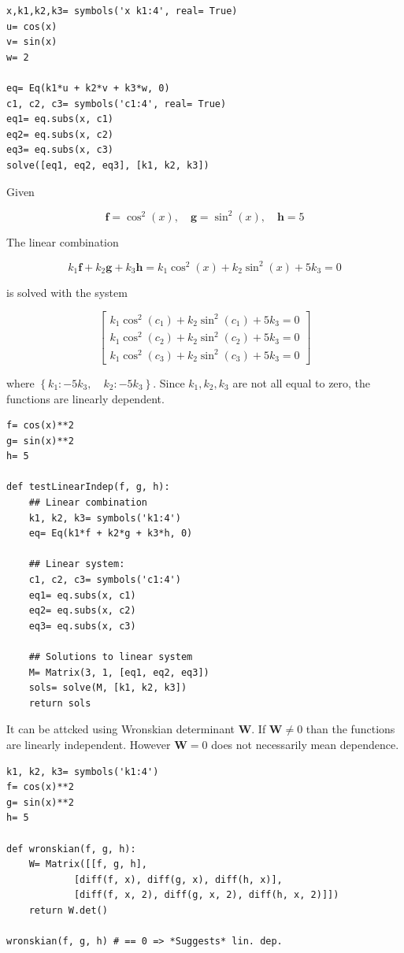 \begin{verbatim}
x,k1,k2,k3= symbols('x k1:4', real= True)
u= cos(x)
v= sin(x)
w= 2

eq= Eq(k1*u + k2*v + k3*w, 0)
c1, c2, c3= symbols('c1:4', real= True)
eq1= eq.subs(x, c1)
eq2= eq.subs(x, c2)
eq3= eq.subs(x, c3)
solve([eq1, eq2, eq3], [k1, k2, k3])
\end{verbatim}

Given

$$
\mathbf{f} = \cos^{2}{\left (x \right )}, \quad
\mathbf{g}= \sin^{2}{\left (x \right )}, \quad
\mathbf{h}= 5
$$

The linear combination

$$
k_{1} \mathbf{f} + k_{2} \mathbf{g} + k_3 \mathbf{h} = 
k_{1} \cos^{2}{\left (x \right )} + k_{2} \sin^{2}{\left (x \right )} + 5 k_{3} = 0
$$

is solved with the system

$$
\left[\begin{matrix}
k_{1} \cos^{2}{\left (c_{1} \right )} + k_{2} \sin^{2}{\left (c_{1} \right )} + 5 k_{3} = 0 \\
k_{1} \cos^{2}{\left (c_{2} \right )} + k_{2} \sin^{2}{\left (c_{2} \right )} + 5 k_{3} = 0 \\
k_{1} \cos^{2}{\left (c_{3} \right )} + k_{2} \sin^{2}{\left (c_{3} \right )} + 5 k_{3} = 0
\end{matrix}\right]
$$

where $\left \{ k_{1} : - 5 k_{3}, \quad k_{2} : - 5 k_{3}\right \}$. Since $k_1,
k_2, k_3$ are not all equal to zero, the functions are linearly dependent. 

\begin{verbatim}
f= cos(x)**2
g= sin(x)**2
h= 5

def testLinearIndep(f, g, h):
    ## Linear combination
    k1, k2, k3= symbols('k1:4')
    eq= Eq(k1*f + k2*g + k3*h, 0)
    
    ## Linear system:
    c1, c2, c3= symbols('c1:4')
    eq1= eq.subs(x, c1)
    eq2= eq.subs(x, c2)
    eq3= eq.subs(x, c3)
    
    ## Solutions to linear system
    M= Matrix(3, 1, [eq1, eq2, eq3])
    sols= solve(M, [k1, k2, k3])
    return sols
\end{verbatim}

It can be attcked using Wronskian determinant \textbf{W}. If $\mathbf{W} \neq 0$ 
than the functions are linearly independent. However $\mathbf{W} = 0$ does not
necessarily mean dependence.

\begin{verbatim}
k1, k2, k3= symbols('k1:4')
f= cos(x)**2
g= sin(x)**2
h= 5

def wronskian(f, g, h):
    W= Matrix([[f, g, h],
            [diff(f, x), diff(g, x), diff(h, x)],
            [diff(f, x, 2), diff(g, x, 2), diff(h, x, 2)]])
    return W.det()
    
wronskian(f, g, h) # == 0 => *Suggests* lin. dep.
\end{verbatim}

